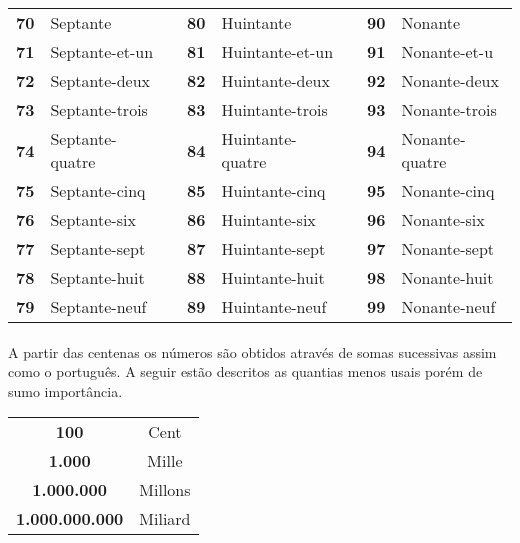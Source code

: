 \documentclass{article}
\begin{document}
            \begin{center}
                \begin{tabular}{r  l  c  r  l  c  r  l}               
                    \textbf{70} & Septante        &   & \textbf{80} & Huintante        &   & \textbf{90} & Nonante\\
                    \textbf{71} & Septante-et-un  &   & \textbf{81} & Huintante-et-un  &   & \textbf{91} & Nonante-et-u\\
                    \textbf{72} & Septante-deux   &   & \textbf{82} & Huintante-deux   &   & \textbf{92} & Nonante-deux\\
                    \textbf{73} & Septante-trois  &   & \textbf{83} & Huintante-trois  &   & \textbf{93} & Nonante-trois\\
                    \textbf{74} & Septante-quatre &   & \textbf{84} & Huintante-quatre &   & \textbf{94} & Nonante-quatre\\
                    \textbf{75} & Septante-cinq   &   & \textbf{85} & Huintante-cinq   &   & \textbf{95} & Nonante-cinq\\
                    \textbf{76} & Septante-six    &   & \textbf{86} & Huintante-six    &   & \textbf{96} & Nonante-six\\
                    \textbf{77} & Septante-sept   &   & \textbf{87} & Huintante-sept   &   & \textbf{97} & Nonante-sept\\
                    \textbf{78} & Septante-huit   &   & \textbf{88} & Huintante-huit   &   & \textbf{98} & Nonante-huit\\
                    \textbf{79} & Septante-neuf   &   & \textbf{89} & Huintante-neuf   &   & \textbf{99} & Nonante-neuf\\
                \end{tabular}
            \end{center} 
        
        \paragraph{}A partir das centenas os números são obtidos através de somas sucessivas assim como o português. A seguir estão descritos as quantias menos usais porém de sumo importância.

            \begin{center}
                \begin{tabular}{c c}
                    \textbf{100}           & Cent\\ 
                    \textbf{1.000}         & Mille\\
                    \textbf{1.000.000}     & Millons\\   
                    \textbf{1.000.000.000} & Miliard\\
                \end{tabular}
            \end{center}
\end{document}
